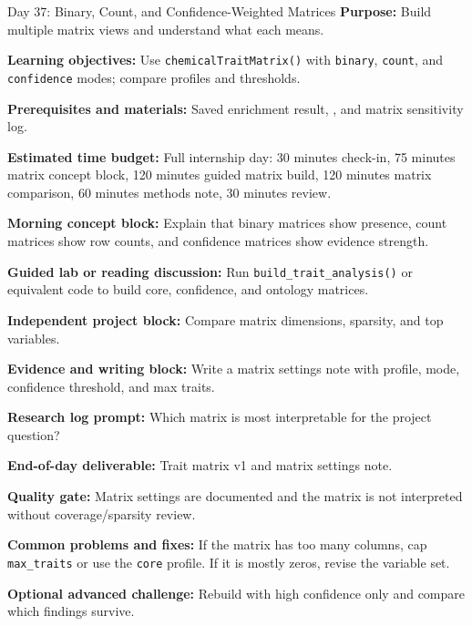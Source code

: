 \begin{dailybox}{Day 37: Binary, Count, and Confidence-Weighted Matrices}
\textbf{Purpose:} Build multiple matrix views and understand what each means.

\textbf{Learning objectives:} Use \texttt{chemicalTraitMatrix()} with \texttt{binary}, \texttt{count}, and \texttt{confidence} modes; compare profiles and thresholds.

\textbf{Prerequisites and materials:} Saved enrichment result, , and matrix sensitivity log.

\textbf{Estimated time budget:} Full internship day: 30 minutes check-in, 75 minutes matrix concept block, 120 minutes guided matrix build, 120 minutes matrix comparison, 60 minutes methods note, 30 minutes review.

\textbf{Morning concept block:} Explain that binary matrices show presence, count matrices show row counts, and confidence matrices show evidence strength.

\textbf{Guided lab or reading discussion:} Run \texttt{build\_trait\_analysis()} or equivalent code to build core, confidence, and ontology matrices.

\textbf{Independent project block:} Compare matrix dimensions, sparsity, and top variables.

\textbf{Evidence and writing block:} Write a matrix settings note with profile, mode, confidence threshold, and max traits.

\textbf{Research log prompt:} Which matrix is most interpretable for the project question?

\textbf{End-of-day deliverable:} Trait matrix v1 and matrix settings note.

\textbf{Quality gate:} Matrix settings are documented and the matrix is not interpreted without coverage/sparsity review.

\textbf{Common problems and fixes:} If the matrix has too many columns, cap \texttt{max\_traits} or use the \texttt{core} profile. If it is mostly zeros, revise the variable set.

\textbf{Optional advanced challenge:} Rebuild with high confidence only and compare which findings survive.
\end{dailybox}

